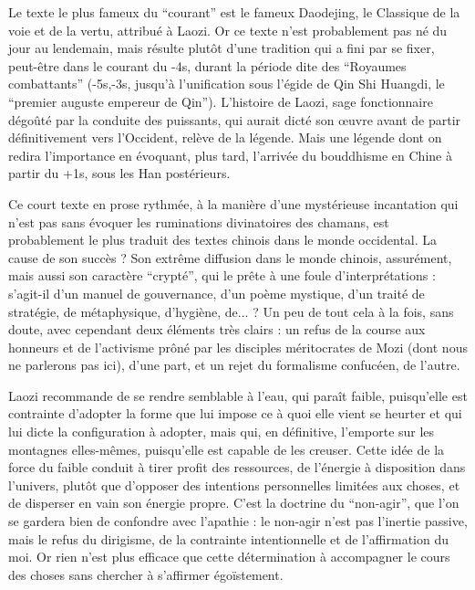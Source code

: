 Le texte le plus fameux du ``courant'' est le fameux Daodejing, le Classique de la voie et
de la vertu, attribué à Laozi.
Or ce texte n'est probablement pas né du jour au lendemain,
mais résulte plutôt d'une tradition qui a fini par se fixer, peut-être dans le courant du
-4s, durant la période dite des ``Royaumes combattants'' (-5s,-3s,
jusqu'à l'unification sous l'égide de Qin Shi Huangdi, le ``premier auguste empereur
de Qin'').
L'histoire de Laozi, sage fonctionnaire dégoûté par la conduite des
puissants, qui aurait dicté son œuvre avant de partir définitivement vers l'Occident, relève
de la légende.
Mais une légende dont on redira l'importance en évoquant, plus tard,
l'arrivée du bouddhisme en Chine à partir du +1s, sous les Han postérieurs.

Ce court texte en prose rythmée, à la manière d'une mystérieuse incantation qui n'est pas
sans évoquer les ruminations divinatoires des chamans, est probablement le plus traduit
des textes chinois dans le monde occidental.
La cause de son succès ? Son extrême diffusion
dans le monde chinois, assurément, mais aussi son caractère ``crypté'', qui le prête à
une foule d'interprétations : s'agit-il d'un manuel de gouvernance, d'un poème mystique,
d'un traité de stratégie, de métaphysique, d'hygiène, de...
? Un peu de tout cela à la fois,
sans doute, avec cependant deux éléments très clairs : un refus de la course aux honneurs
et de l'activisme prôné par les disciples méritocrates de Mozi (dont nous ne parlerons pas
ici), d'une part, et un rejet du formalisme confucéen, de l'autre.

Laozi recommande de se rendre semblable à l'eau, qui paraît faible, puisqu'elle est
contrainte d'adopter la forme que lui impose ce à quoi elle vient se heurter et qui lui dicte
la configuration à adopter, mais qui, en définitive, l'emporte sur les montagnes elles-mêmes,
puisqu'elle est capable de les creuser.
Cette idée de la force du faible conduit à
tirer profit des ressources, de l'énergie à disposition dans l'univers, plutôt que d'opposer
des intentions personnelles limitées aux choses, et de disperser en vain son énergie propre.
C'est la doctrine du ``non-agir'', que l'on se gardera bien de confondre avec
l'apathie : le non-agir n'est pas l'inertie passive, mais le refus du dirigisme, de la
contrainte intentionnelle et de l'affirmation du moi.
Or rien n'est plus efficace que cette
détermination à accompagner le cours des choses sans chercher à s'affirmer égoïstement.

